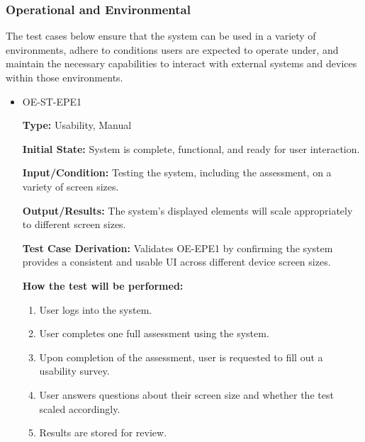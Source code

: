 \documentclass[12pt, titlepage]{article}
\begin{document}
\subsubsection{Operational and Environmental}

\hspace{2em}The test cases below ensure that the system can be used in a variety of environments,
adhere to conditions users are expected to operate under, and maintain the necessary capabilities
to interact with external systems and devices within those environments.

\begin{itemize}
  \item OE-ST-EPE1
  \begin{mdframed}[linewidth=0.5mm]
      \textbf{Type:} Usability, Manual \par
      \textbf{Initial State:} System is complete, functional, and ready for user interaction. \par
      \textbf{Input/Condition:} Testing the system, including the assessment, on a variety of screen sizes. \par
      \textbf{Output/Results:} The system's displayed elements will scale appropriately to different screen sizes. \par
      \textbf{Test Case Derivation:} Validates OE-EPE1 by confirming the system provides a consistent and usable UI across different device screen sizes. \par
      \textbf{How the test will be performed:}
      \begin{enumerate}[noitemsep]
        \item User logs into the system.
        \item User completes one full assessment using the system.
        \item Upon completion of the assessment, user is requested to fill out a usability survey.
        \item User answers questions about their screen size and whether the test scaled accordingly.
        \item Results are stored for review.
      \end{enumerate}
  \end{mdframed}


\end{itemize}
\end{document}
